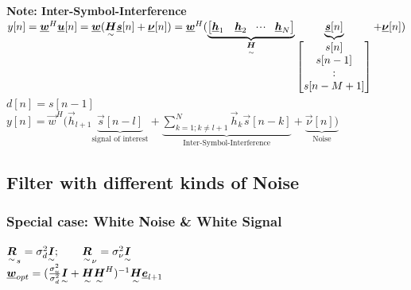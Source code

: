 \begin{doublespace}
\textbf{Note: Inter-Symbol-Interference}\\
$y[n]=\vec{w}^H\vec{u}[n] = \vec{w}(\ma{H}\vec{s}[n]+\vec{\nu}[n]) = \vec{w}^H(\underbrace{\mat{\vec{h}_1&\vec{h}_2&\shdots&\vec{h}_N}}_{\ma{H}}\underbrace{\vec{s}[n]}_{\mat{s[n]\\s[n-1]\\\svdots\\s[n-M+1]}}+\vec{\nu}[n])$\\
$d[n]=s[n-1]$\\
$y[n]=\vec{w}^H(\vec{h}_{l+1}\underbrace{\vec{s}[n-l]}_{\text{signal of interest}}+\underbrace{\sum\limits_{k=1; k\neq l+1}^{N}\vec{h}_k \vec{s}[n-k]}_{\text{Inter-Symbol-Interference}}+\underbrace{\vec{\nu}[n])}_{\text{Noise}}$\\
\subsection{Filter with different kinds of Noise}

\subsubsection{Special case: White Noise \& White Signal} 
$\ma{R}_s=\sigma_d^2\ma{I};\qquad \ma{R}_\nu=\sigma_\nu^2\ma{I}$\\
$\vec{w}_{opt}=(\frac{\sigma_u^2}{\sigma_d^2}\ma{I}+\ma{H}\ma{H}^H)^{-1}\ma{H}\vec{e}_{l+1}$\\
\\

\end{doublespace}

